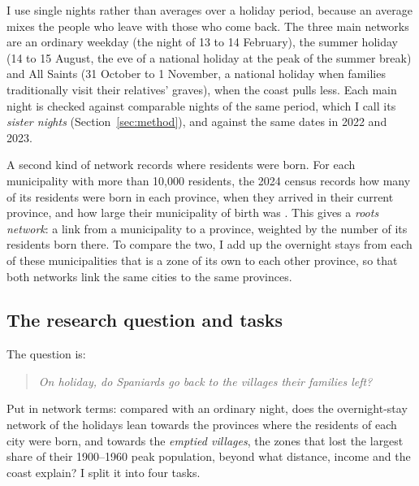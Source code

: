 I use single nights rather than averages over a holiday period, because an average mixes the people who leave with those who come back. The three main networks are an ordinary weekday (the night of 13 to 14 February), the summer holiday (14 to 15 August, the eve of a national holiday at the peak of the summer break) and All Saints (31 October to 1 November, a national holiday when families traditionally visit their relatives' graves), when the coast pulls less. Each main night is checked against comparable nights of the same period, which I call its \emph{sister nights} (Section~\ref{sec:method}), and against the same dates in 2022 and 2023.

A second kind of network records where residents were born. For each municipality with more than 10,000 residents, the 2024 census records how many of its residents were born in each province, when they arrived in their current province, and how large their municipality of birth was \citep{ine2025censo}. This gives a \emph{roots network}: a link from a municipality to a province, weighted by the number of its residents born there. To compare the two, I add up the overnight stays from each of these municipalities that is a zone of its own to each other province, so that both networks link the same cities to the same provinces.

\clearpage
\subsection{The research question and tasks}

The question is:

\begin{quote}
\emph{On holiday, do Spaniards go back to the villages their families left?}
\end{quote}

Put in network terms: compared with an ordinary night, does the overnight-stay network of the holidays lean towards the provinces where the residents of each city were born, and towards the \emph{emptied villages}, the zones that lost the largest share of their 1900--1960 peak population, beyond what distance, income and the coast explain? I split it into four tasks.

